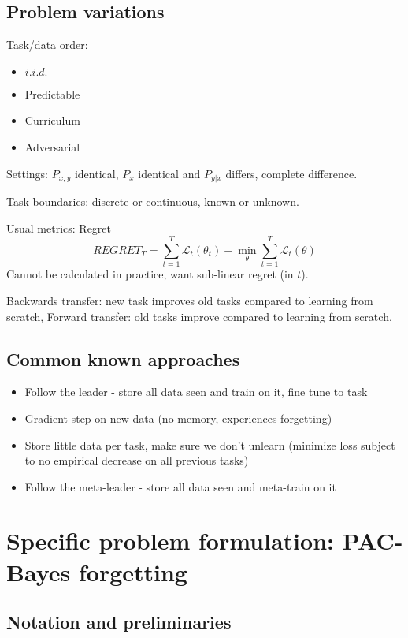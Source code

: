 \documentclass[letterpaper]{article}
\theoremstyle{definition}
\begin{document}
\subsection{Problem variations}

Task/data order:
\begin{itemize}
	\item $i.i.d.$
	\item Predictable
	\item Curriculum
	\item Adversarial
\end{itemize}

Settings: $P_{x,y}$ identical, $P_x$ identical and $P_{y|x}$ differs, complete difference.

Task boundaries: discrete or continuous, known or unknown.

Usual metrics:
Regret $$REGRET_T = \sum_{t=1}^{T}\mathcal{L}_t(\theta_t)-\min_\theta \sum_{t=1}^{T}\mathcal{L}_t(\theta)$$
Cannot be calculated in practice, want sub-linear regret (in $t$).

Backwards transfer: new task improves old tasks compared to learning from scratch, Forward transfer: old tasks improve compared to learning from scratch.

\subsection{Common known approaches}
\begin{itemize}
	\item Follow the leader - store all data seen and train on it, fine tune to task
	\item Gradient step on new data (no memory, experiences forgetting)
	\item Store little data per task, make sure we don't unlearn (minimize loss subject to no empirical decrease on all previous tasks)
	\item Follow the meta-leader - store all data seen and meta-train on it
\end{itemize}

\section{Specific problem formulation: PAC-Bayes forgetting}
	
\subsection{Notation and preliminaries}
\end{document}
